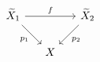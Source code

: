 \documentclass{article}
\begin{document}
    \begin{equation*}
        \begin{tikzcd}[column sep = 0.5cm]
            \widetilde{X}_1 \ar[rr, "f"] \ar[dr, "p_1"'] & & \widetilde{X}_2 \ar[dl, "p_2"] \\
            & X
        \end{tikzcd}
    \end{equation*}
\end{document}

